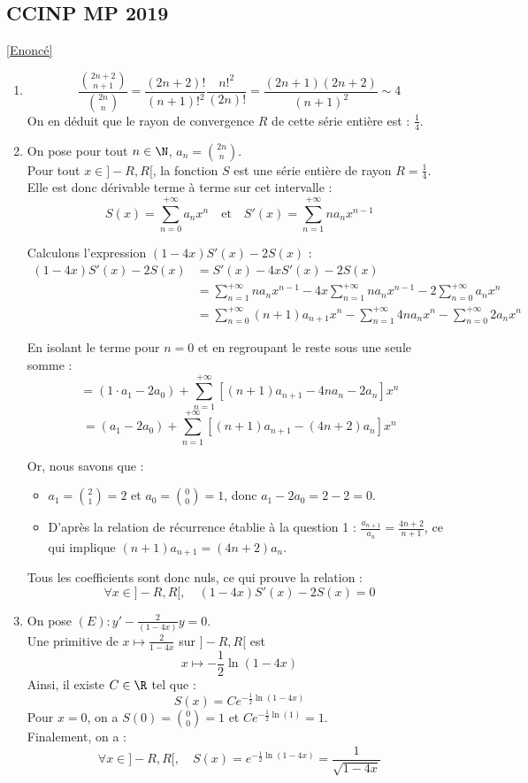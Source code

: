 \documentclass{book}
\begin{document}
	
	\subsection{CCINP MP 2019}\label{sec:ccinp-mp-2019}
	\textcolor{blue}{\hyperref[CCINP MP 2019]{[Enoncé]}}\\
	\begin{enumerate}
		\item \[\frac{\binom{2n+2}{n+1}}{\binom{2n}{n}}=\frac{(2n+2)!}{(n+1)!^2}\frac{n!^2}{(2n)!}=\frac{(2n+1)(2n+2)}{(n+1)^2}\sim 4\]
		On en déduit que le rayon de convergence $R$ de cette série entière est : $\frac{1}{4}$.
		\item On pose pour tout $n\in\N$, $a_n=\binom{2n}{n}$.\\
		Pour tout $x \in ]-R, R[$, la fonction $S$ est une série entière de rayon $R = \frac{1}{4}$. Elle est donc dérivable terme à terme sur cet intervalle :
		\[ S(x) = \sum_{n=0}^{+\infty} a_n x^n \quad \text{et} \quad S'(x) = \sum_{n=1}^{+\infty} n a_n x^{n-1} \]
		
		Calculons l'expression $(1-4x)S'(x) - 2S(x)$ :
		\begin{align*}
			(1-4x)S'(x) - 2S(x) &= S'(x) - 4xS'(x) - 2S(x) \\
			&= \sum_{n=1}^{+\infty} n a_n x^{n-1} - 4x \sum_{n=1}^{+\infty} n a_n x^{n-1} - 2 \sum_{n=0}^{+\infty} a_n x^n \\
			&= \sum_{n=0}^{+\infty} (n+1) a_{n+1} x^n - \sum_{n=1}^{+\infty} 4n a_n x^n - \sum_{n=0}^{+\infty} 2a_n x^n
		\end{align*}
		
		En isolant le terme pour $n=0$ et en regroupant le reste sous une seule somme :
		\[ = \left( 1 \cdot a_1 - 2a_0 \right) + \sum_{n=1}^{+\infty} \left[ (n+1) a_{n+1} - 4n a_n - 2 a_n \right] x^n \]
		\[ = \left( a_1 - 2a_0 \right) + \sum_{n=1}^{+\infty} \left[ (n+1) a_{n+1} - (4n+2) a_n \right] x^n \]
		
		Or, nous savons que :
		\begin{itemize}
			\item $a_1 = \binom{2}{1} = 2$ et $a_0 = \binom{0}{0} = 1$, donc $a_1 - 2a_0 = 2 - 2 = 0$.
			\item D'après la relation de récurrence établie à la question 1 : $\frac{a_{n+1}}{a_n} = \frac{4n+2}{n+1}$, ce qui implique $(n+1)a_{n+1} = (4n+2)a_n$.
		\end{itemize}
		
		Tous les coefficients sont donc nuls, ce qui prouve la relation :
		\[ \forall x \in ]-R, R[, \quad (1-4x)S'(x) - 2S(x) = 0 \]
		\item On pose $\displaystyle (E) : y'-\frac{2}{(1-4x)}y=0$.\\
		Une primitive de $x\mapsto \frac{2}{1-4x}$ sur $]-R,R[$ est 
		\[x\mapsto -\frac{1}{2}\ln(1-4x)\]
		Ainsi, il existe $C\in\R$ tel que : 
		\[S(x)=Ce^{-\frac{1}{2}\ln(1-4x)}\]
		Pour $x=0$, on a $S(0)=\binom{0}{0}=1$ et $Ce^{-\frac{1}{2}\ln(1)}=1$.\\
		Finalement, on a :
		\[\forall x\in]-R,R[,\quad S(x)=e^{-\frac{1}{2}\ln(1-4x)}=\frac{1}{\sqrt{1-4x}}\]
	\end{enumerate}
\end{document}
